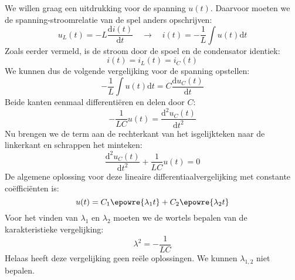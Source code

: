We willen graag een uitdrukking voor de spanning $u(t)$. Daarvoor moeten we de spanning-stroomrelatie van de spel anders opschrijven:
%
\begin{equation}
u_L(t) = -L\dfrac{\mathrm{d}i(t)}{\mathrm{d}t} \quad\longrightarrow\quad i(t) = -\dfrac{1}{L}\int u(t) \mathrm{d}t
\end{equation}
%
Zoals eerder vermeld, is de stroom door de spoel en de condensator identiek:
%
\begin{equation}
i(t) = i_L(t) = i_C(t)
\end{equation}
%
We kunnen dus de volgende vergelijking voor de spanning opstellen:
%
\begin{equation}
-\dfrac{1}{L}\int u(t) \mathrm{d}t = C\dfrac{\mathrm{d}u_C(t)}{\mathrm{d}t}
\end{equation}
%
Beide kanten eenmaal differentiëren en delen door $C$:
%
\begin{equation}
-\dfrac{1}{LC}u(t) =\dfrac{\mathrm{d}^2u_C(t)}{\mathrm{d}t^2}
\end{equation}
%
Nu brengen we de term aan de rechterkant van het isgelijkteken naar de linkerkant en schrappen het minteken:
%
\begin{equation}
\dfrac{\mathrm{d}^2u_C(t)}{\mathrm{d}t^2} + \dfrac{1}{LC}u(t) = 0
\end{equation}
%
De algemene oplossing voor deze lineaire differentiaalvergelijking met constante coëfficiënten is:
%
\begin{equation}
u(t) = C_1\epowre{\lambda_1t} + C_2\epowre{\lambda_2t}
\end{equation}
%
Voor het vinden van $\lambda_1$ en $\lambda_2$ moeten we de wortels bepalen van de karakteristieke vergelijking:
%
\begin{equation}
\lambda^2 = -\dfrac{1}{LC}
\end{equation}
%
Helaas heeft deze vergelijking geen reële oplossingen. We kunnen $\lambda_{1,2}$ niet bepalen.

%
%



